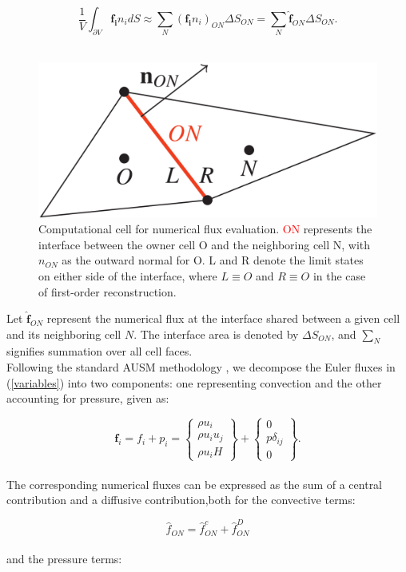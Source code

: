 \documentclass[a5paper]{sapthesis}
\begin{document}
	\begin{equation}
		\frac{1}{V} \int_{\partial V} \mathbf{f_i} n_i dS \approx \sum_N (\mathbf{f_i} n_i)_{ON} \Delta S_{ON} = \sum_N \mathbf{\hat{f}}_{ON} \Delta S_{ON}.
	\end{equation}
	\\
	\begin{figure}[h]
		\centering
		\includegraphics[width=0.4 \linewidth]{Figures/CELL.png}
		\caption{Computational cell for numerical flux evaluation. \textcolor{red}{ON} represents the interface between the owner cell O and the neighboring cell N, with $n_{ON}$ as the outward normal for O. L and R denote the limit states on either side of the interface, where $L\equiv O$ and $R \equiv O$ in the case of first-order reconstruction.}
		\label{figure:cells}
	\end{figure} 
	
	\noindent Let $\mathbf{\hat{f}}_{ON}$ represent the numerical flux at the interface shared between a given cell and its neighboring cell $N$. The interface area is denoted by $\Delta S_{ON}$, and $\sum_N$ signifies summation over all cell faces.
	\\
	Following the standard AUSM methodology \cite{LIOU_AUSM}, we decompose the Euler fluxes in (\ref{variables})  into two components: one representing convection and the other accounting for pressure, given as:
	
	\begin{equation}
		\mathbf{f}_i = f_i + p_i =
		\begin{Bmatrix}
			\rho u_i \\
			\rho u_i u_j \\
			\rho u_i H
		\end{Bmatrix}
		+
		\begin{Bmatrix}
			0 \\
			p \delta_{ij} \\
			0
		\end{Bmatrix}.
	\end{equation}
	\\
	The corresponding numerical fluxes can be expressed as the sum of a central contribution and a diffusive contribution,both for the convective terms:
	
	\begin{equation}
		\hat{f}_{ON} = \hat{f}^{c}_{ON} + \hat{f}^{D}_{ON}
		\label{convective_central_diffusive_fluxes}
	\end{equation}
	\\
	and the pressure terms:
	
\end{document}

